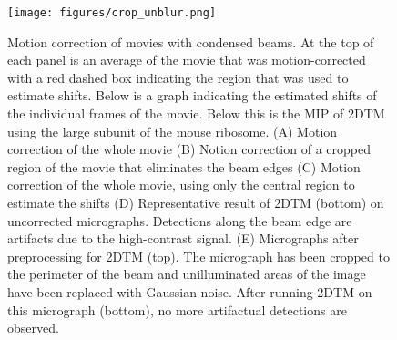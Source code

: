 \documentclass[
]{article}
\newenvironment{fignos:tagged-figure}[1][]{
    \let\oldthefigure\thefigure
    \let\oldtheHfigure\theHfigure
    \renewcommand{\thefigure}{#1}
    \renewcommand{\theHfigure}{#1}
  }{
    \let\thefigure\oldthefigure
    \let\theHfigure\oldtheHfigure
    \addtocounter{figure}{-1}
  }
\providecommand{\DIFaddbegin}{} %
\providecommand{\DIFaddend}{} %
\providecommand{\DIFdelbegin}{} %
\providecommand{\DIFdelend}{} %
\providecommand{\DIFaddbeginFL}{} %
\providecommand{\DIFaddendFL}{} %
\providecommand{\DIFdelbeginFL}{} %
\providecommand{\DIFdelendFL}{} %
\newcommand{\DIFscaledelfig}{0.5}
\newlength{\DIFdelgraphicswidth} %
\newlength{\DIFdelgraphicsheight} %
\newcommand{\DIFaddincludegraphics}[2][]{{\color{blue}\fbox{\DIFOincludegraphics[#1]{#2}}}} %
\newcommand{\DIFdelincludegraphics}[2][]{%
\sbox{\DIFdelgraphicsbox}{\DIFOincludegraphics[#1]{#2}}%
\settoboxwidth{\DIFdelgraphicswidth}{\DIFdelgraphicsbox} %
\settoboxtotalheight{\DIFdelgraphicsheight}{\DIFdelgraphicsbox} %
\scalebox{\DIFscaledelfig}{%
\parbox[b]{\DIFdelgraphicswidth}{\usebox{\DIFdelgraphicsbox}\\[-\baselineskip] \rule{\DIFdelgraphicswidth}{0em}}\llap{\resizebox{\DIFdelgraphicswidth}{\DIFdelgraphicsheight}{%
\setlength{\unitlength}{\DIFdelgraphicswidth}%
\begin{picture}(1,1)%
\thicklines\linethickness{2pt} %
{\color[rgb]{1,0,0}\put(0,0){\framebox(1,1){}}}%
{\color[rgb]{1,0,0}\put(0,0){\line( 1,1){1}}}%
{\color[rgb]{1,0,0}\put(0,1){\line(1,-1){1}}}%
\end{picture}%
}\hspace*{3pt}}} %
} %
\DeclareRobustCommand{\DIFaddbegin}{\DIFOaddbegin \let\includegraphics\DIFaddincludegraphics} %
\DeclareRobustCommand{\DIFaddend}{\DIFOaddend \let\includegraphics\DIFOincludegraphics} %
\DeclareRobustCommand{\DIFdelbegin}{\DIFOdelbegin \let\includegraphics\DIFdelincludegraphics} %
\DeclareRobustCommand{\DIFdelend}{\DIFOaddend \let\includegraphics\DIFOincludegraphics} %
\DeclareRobustCommand{\DIFaddbeginFL}{\DIFOaddbeginFL \let\includegraphics\DIFaddincludegraphics} %
\DeclareRobustCommand{\DIFaddendFL}{\DIFOaddendFL \let\includegraphics\DIFOincludegraphics} %
\DeclareRobustCommand{\DIFdelbeginFL}{\DIFOdelbeginFL \let\includegraphics\DIFdelincludegraphics} %
\DeclareRobustCommand{\DIFdelendFL}{\DIFOaddendFL \let\includegraphics\DIFOincludegraphics} %
\begin{document}
\DIFdelbegin %
\DIFdelend \DIFaddbegin \begin{fignos:tagged-figure}
\DIFaddend 

\begin{figure}
\DIFdelbeginFL %
\DIFdelendFL \DIFaddbeginFL \hypertarget{fig:crop_unblur}{%
\centering
\texttt{[image: figures/crop\_unblur.png]}
\caption{Motion correction of movies with condensed beams. At the top of each
panel is an average of the movie that was motion-corrected with a red
dashed box indicating the region that was used to estimate shifts. Below
is a graph indicating the estimated shifts of the individual frames of
the movie. Below this is the MIP of 2DTM using the large subunit of the
mouse ribosome. (A) Motion correction of the whole movie (B) Notion
correction of a cropped region of the movie that eliminates the beam
edges (C) Motion correction of the whole movie, using only the central
region to estimate the shifts (D) Representative result of 2DTM (bottom)
on uncorrected micrographs. Detections along the beam edge are artifacts
due to the high-contrast signal. (E) Micrographs after preprocessing for
2DTM (top). The micrograph has been cropped to the perimeter of the beam
and unilluminated areas of the image have been replaced with Gaussian
noise. After running 2DTM on this micrograph (bottom), no more
artifactual detections are
observed.}\label{fig:crop_unblur}
}
\DIFaddendFL \end{figure}

\end{fignos:tagged-figure}
\end{document}
